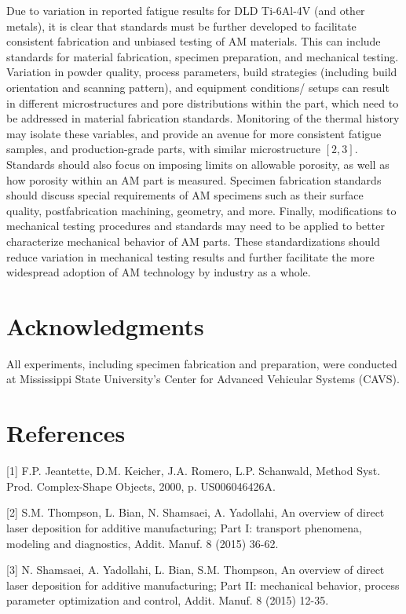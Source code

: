 \documentclass[10pt]{article}
\begin{document}
Due to variation in reported fatigue results for DLD Ti-6Al-4V (and other metals), it is clear that standards must be further developed to facilitate consistent fabrication and unbiased testing of AM materials. This can include standards for material fabrication, specimen preparation, and mechanical testing. Variation in powder quality, process parameters, build strategies (including build orientation and scanning pattern), and equipment conditions/ setups can result in different microstructures and pore distributions within the part, which need to be addressed in material fabrication standards. Monitoring of the thermal history may isolate these variables, and provide an avenue for more consistent fatigue samples, and production-grade parts, with similar microstructure $[2,3]$. Standards should also focus on imposing limits on allowable porosity, as well as how porosity within an AM part is measured. Specimen fabrication standards should discuss special requirements of AM specimens such as their surface quality, postfabrication machining, geometry, and more. Finally, modifications to mechanical testing procedures and standards may need to be applied to better characterize mechanical behavior of AM parts. These standardizations should reduce variation in mechanical testing results and further facilitate the more widespread adoption of AM technology by industry as a whole.

\section*{Acknowledgments}
All experiments, including specimen fabrication and preparation, were conducted at Mississippi State University's Center for Advanced Vehicular Systems (CAVS).

\section*{References}
[1] F.P. Jeantette, D.M. Keicher, J.A. Romero, L.P. Schanwald, Method Syst. Prod. Complex-Shape Objects, 2000, p. US006046426A.

[2] S.M. Thompson, L. Bian, N. Shamsaei, A. Yadollahi, An overview of direct laser deposition for additive manufacturing; Part I: transport phenomena, modeling and diagnostics, Addit. Manuf. 8 (2015) 36-62.

[3] N. Shamsaei, A. Yadollahi, L. Bian, S.M. Thompson, An overview of direct laser deposition for additive manufacturing; Part II: mechanical behavior, process parameter optimization and control, Addit. Manuf. 8 (2015) 12-35.
\end{document}
